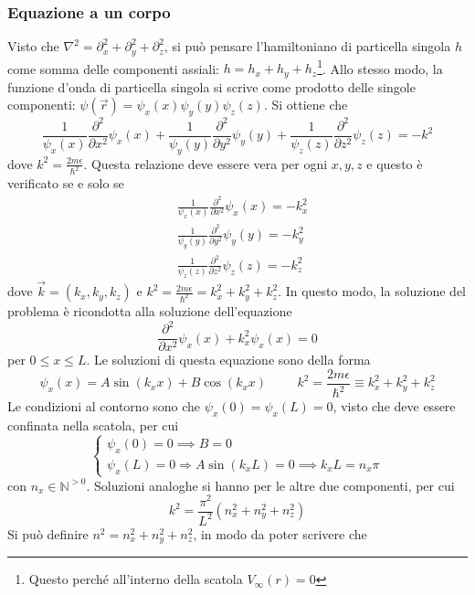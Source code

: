 \documentclass[11pt, a4paper]{scrartcl}
\theoremstyle{style}
\numberwithin{equation}{subsection}
\begin{document}
\subsubsection{Equazione a un corpo}

Visto che $\nabla ^2 = \partial _x^2 + \partial _y^2 + \partial _z^2$, si pu\`o pensare l'hamiltoniano di particella singola $h$ come somma delle componenti assiali: $h = h_x + h_y + h_z$\footnote{Questo perch\'e all'interno della scatola $V_\infty(r)=0$}.
Allo stesso modo, la funzione d'onda di particella singola si scrive come prodotto delle singole componenti: $\psi (\vec{r}) = \psi _x(x)  \psi _y(y) \psi _z(z)$.
Si ottiene che
\[
\frac{1}{\psi _x(x)} \frac{\partial ^2}{\partial x^2} \psi _x(x) + \frac{1}{\psi _y(y)} \frac{\partial ^2}{\partial y^2} \psi _y(y) +\frac{1}{\psi _z(z)} \frac{\partial ^2}{\partial z^2} \psi _z(z) = - k^2
\] 
dove $k^2 = \frac{2m \epsilon }{\hbar ^2}$.
Questa relazione deve essere vera per ogni $x,y,z$ e questo \`e verificato se e solo se 
\[
	\begin{split}
		&\frac{1}{\psi _x(x)} \frac{\partial ^2}{\partial x^2} \psi_x (x) = - k_x^2\\
		&\frac{1}{\psi _y(y)} \frac{\partial ^2}{\partial y^2} \psi_y (y) = - k_y^2\\
		&\frac{1}{\psi _z(z)} \frac{\partial ^2}{\partial z^2} \psi_z (z) = - k_z^2
	\end{split}
\] 
dove $\vec{k}=(k_x,k_y,k_z)$ e $k^2 = \frac{2m\epsilon }{\hbar ^2} = k_x ^2 + k_y^2 + k_z^2$.
In questo modo, la soluzione del problema \`e ricondotta alla soluzione dell'equazione 
\begin{equation}
	\frac{\partial ^2}{\partial x^2} \psi _x(x) + k_x^2 \psi _x(x) = 0
\end{equation}
per $0\le x\le L$.
Le soluzioni di questa equazione sono della forma
\[
\psi _x(x) = A \sin (k_x x ) + B \cos(k_x x)  \hspace{1cm} k^2 = \frac{2m \epsilon }{\hbar ^2} \equiv k_x^2 + k_y^2 + k_z^2
\] 
Le condizioni al contorno sono che $\psi_x (0)=\psi _x(L) = 0 $, visto che deve essere confinata nella scatola, per cui 
\[
\begin{cases}
	\psi _x(0) = 0 \implies B=0\\
	\psi _x(L) = 0 \Rightarrow  A \sin (k_x L) = 0 \implies k_x L = n_x \pi
\end{cases}
\] 
con $n_x \in \mathbb{N}^{>0}$.
Soluzioni analoghe si hanno per le altre due componenti, per cui 
\[
k^2 = \frac{\pi^2}{L^2} \left(n_x^2 + n_y^2+ n_z^2\right) 
\] 
Si pu\`o definire $n^2 = n_x ^2 + n_y^2 + n_z^2$, in modo da poter scrivere che 
\end{document}

